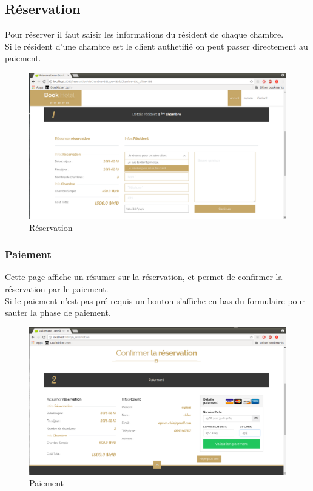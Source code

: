 \documentclass[12pt,a4paper]{report}
\begin{document}
	\subsection{Réservation}
Pour réserver il faut saisir les informations du résident de chaque chambre.\\
Si le résident d'une chambre est le client authetifié on peut passer directement au paiement.
	\vspace{2cm}
	\begin{figure}[!hbtp]
		\centering
		\includegraphics[scale=0.3]{./graphics/reservation.png}
		\caption{Réservation}
		\end{figure}
		\newpage
	
	\subsubsection{Paiement}
Cette page affiche un résumer sur la réservation, et permet de confirmer la réservation par le paiement.\\
Si le paiement n'est pas pré-requis un bouton s'affiche en bas du formulaire pour sauter la phase de paiement.\\
	\vspace{2cm}
	\begin{figure}[!hbtp]
		\centering
		\includegraphics[scale=0.3]{./graphics/paiement.png}
		\caption{Paiement}
		\end{figure}
		\newpage
\end{document}
